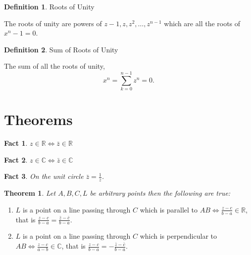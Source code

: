 \documentclass[10pt]{article}
\theoremstyle{definition}
\newtheorem*{defn}{Definition}
\theoremstyle{plain}
\newtheorem*{thm}{Theorem}
\newtheorem*{fct}{Fact}
\theoremstyle{remark}
\newcommand{\conjugate}[1]{\bar{#1}}
\begin{document}
\begin{defn}{Roots of Unity}

The roots of unity are powers of $z - 1, z, z^{2}, \ldots, z^{n-1}$ which are all the roots of $x^{n} -1 = 0$.

\end{defn}

\medskip

\begin{defn}{Sum of Roots of Unity}

The sum of all the roots of unity, \[x^{n} = \sum^{n-1}_{k = 0} z^{n} = 0. \]

\end{defn}

\bigskip

\section*{Theorems}

\begin{fct}

$z \in \mathbb{R} \Leftrightarrow \conjugate{z} \in \mathbb{R}$

\end{fct}

\medskip

\begin{fct}

$ z \in \mathbb{C} \Leftrightarrow \conjugate{z} \in \mathbb{C} $

\end{fct}

\medskip

\begin{fct}

On the unit circle $\conjugate{z} = \frac{1}{z}$.

\end{fct}

\bigskip


\begin{thm}
Let $A, B, C, L$ be arbitrary points then the following are true:
\end{thm}

\begin{enumerate}
    \item $L$ is a point on a line passing through $C$ which is parallel to $AB \Leftrightarrow \frac{z - c}{b - a} \in \mathbb{R}$, that is $\frac{z - c}{b - a} = \frac{\conjugate{z} - \conjugate{c}}{b - a}$.
    \item $L$ is a point on a line passing through $C$ which is perpendicular to $AB \Leftrightarrow \frac{z -c}{a - b} \in \mathbb{C}$, that is $ \frac{z - c}{b - a} = - \frac{\conjugate{z} - \conjugate{c}}{b - a}$.
\end{enumerate}
\end{document}
